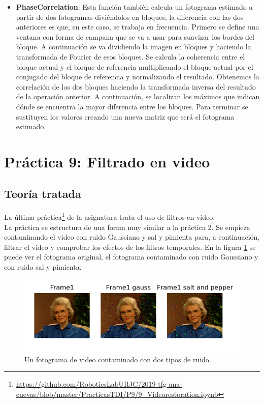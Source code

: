 \begin{itemize}
	\item \textbf{PhaseCorrelation}: Esta función también calcula un fotograma estimado a partir de dos fotogramas diviéndolos en bloques, la diferencia con las dos anteriores es que, en este caso, se trabaja en frecuencia. Primero se define una ventana con forma de campana que se va a usar para suavizar los bordes del bloque. A continuación se va dividiendo la imagen en bloques y haciendo la transformada de Fourier de esos bloques.  Se calcula la coherencia entre el bloque actual y el bloque de referencia multiplicando el bloque actual por el conjugado del bloque de referencia y normalizando el resultado. Obtenemos la correlación de los dos bloques haciendo la transformada inversa del resultado de la operación anterior. A continuación, se localizan los máximos que indican dónde se encuentra la mayor diferencia entre los bloques. Para terminar se sustituyen los valores creando una nueva matriz que será el fotograma estimado.
\end{itemize}

\section{Práctica 9: Filtrado en video}
\subsection{Teoría tratada}

La última práctica\footnote{\url{https://github.com/RoboticsLabURJC/2019-tfg-ana-cuevas/blob/master/PracticasTDI/P9/9_Videorestoration.ipynb}} de la asignatura trata el uso de filtros en video.\\

La práctica se estructura de una forma muy similar a la práctica 2. Se empieza contaminando el video con ruido Gaussiano y sal y pimienta para, a continuación, filtrar el video y comprobar los efectos de los filtros temporales. En la figura \ref{ruidovideo} se puede ver el fotograma original, el fotograma contaminado con ruido Gaussiano y con ruido sal y pimienta.\\
\begin{figure}[h]
\centering
\includegraphics[width=1.0\textwidth]{imagenes/ruidovideo}
\caption{Un fotograma de video contaminado con dos tipos de ruido.}
\label{ruidovideo} 
\end{figure}

